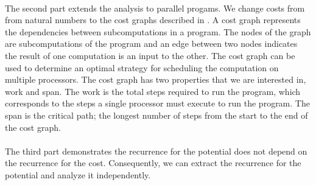 \paragraph{}
The second part extends the analysis to parallel progams. We change costs from
from natural numbers to the cost graphs described in \citet{Harper2013}. A cost
graph represents the dependencies between subcomputations in a program. The
nodes of the graph are subcomputations of the program and an edge between two
nodes indicates the result of one computation is an input to the other. The
cost graph can be used to determine an optimal strategy for scheduling the
computation on multiple processors. The cost graph has two properties that we
are interested in, work and span. The work is the total steps required to run
the program, which corresponds to the steps a single processor must execute to
run the program. The span is the critical path; the longest number of steps
from the start to the end of the cost graph.

\paragraph{}
The third part demonstrates the recurrence for the potential does not depend on
the recurrence for the cost. Consequently, we can extract the recurrence for the
potential and analyze it independently.
